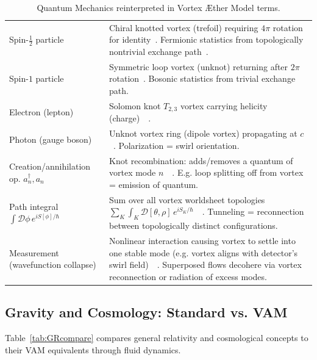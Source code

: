 \documentclass[a4paper,12pt]{article}
\begin{document}
\begin{table}[H]
\begin{tabular}{p{} | p{}}
            Spin-$\frac{1}{2}$ particle & Chiral knotted vortex (trefoil) requiring $4\pi$ rotation for identity~\cite{reference_190}. Fermionic statistics from topologically nontrivial exchange path~\cite{reference_191}. \\
            Spin-$1$ particle & Symmetric loop vortex (unknot) returning after $2\pi$ rotation~\cite{reference_192}. Bosonic statistics from trivial exchange path. \\
            Electron (lepton) & Solomon knot $T_{2,3}$ vortex carrying helicity (charge)~\cite{reference_193}~\cite{reference_194}. \\
            Photon (gauge boson) & Unknot vortex ring (dipole vortex) propagating at $c$~\cite{reference_195}. Polarization = swirl orientation. \\
            Creation/annihilation op. $a_n^\dagger, a_n$ & Knot recombination: adds/removes a quantum of vortex mode $n$~\cite{reference_196}~\cite{reference_197}. E.g. loop splitting off from vortex = emission of quantum. \\
            Path integral $\int \mathcal{D}\phi\,e^{iS[\phi]/\hbar}$ & Sum over all vortex worldsheet topologies $\sum_K \int_{K}\mathcal{D}[\theta,\rho]\,e^{iS_K/\hbar}$~\cite{reference_198}~\cite{reference_199}. Tunneling = reconnection between topologically distinct configurations. \\
            Measurement (wavefunction collapse) & Nonlinear interaction causing vortex to settle into one stable mode (e.g. vortex aligns with detector’s swirl field)~\cite{reference_200}~\cite{reference_201}. Superposed flows decohere via vortex reconnection or radiation of excess modes. \\
            \hline
        \end{tabular}
        \caption{Quantum Mechanics reinterpreted in Vortex Æther Model terms.}
        \label{tab:QMcompare}
    \end{table}

    \newpage

    \subsection{Gravity and Cosmology: Standard vs. VAM}
    Table~\ref{tab:GRcompare} compares general relativity and cosmological concepts to their VAM equivalents through fluid dynamics.
\end{document}
